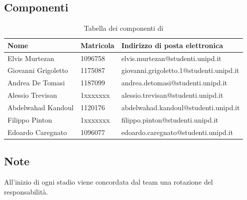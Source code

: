 \subsection{Componenti}
{
    \renewcommand{\arraystretch}{2}
	\begin{longtable}{ C{4cm} C{2cm} C{8cm} }
		\caption{Tabella dei componenti di \Gruppo{}}\\
		\rowcolor{\primaryColor}
        \textcolor{\secondaryColor}{\textbf{Nome}} & \textcolor{\secondaryColor}{\textbf{Matricola}} & \textcolor{\secondaryColor}{\textbf{Indirizzo di posta elettronica}}\\\endhead	
        {Elvis Murtezan} & 1096758 & {elvis.murtezan@studenti.unipd.it}\\   
        {Giovanni Grigoletto} & 1175087 & {giovanni.grigoletto.1@studenti.unipd.it}\\    
        {Andrea De Tomasi} & 1187099 & {andrea.detomasi@studenti.unipd.it}\\    
        {Alessio Trevisan} & 1xxxxxxx & {alessio.trevisan@studenti.unipd.it}\\    
        {Abdelwahad Kandoul} & 1120176 & {abdelwahad.kandoul@studenti.unipd.it} \\    
        {Filippo Pinton} & 1xxxxxxx & {filippo.pinton@studenti.unipd.it}\\    
        {Edoardo Caregnato} & 1096077 & {edoardo.caregnato@studenti.unipd.it}\\       
	\end{longtable}
}
\subsection{Note}
All'inizio di ogni stadio viene concordata dal team una rotazione del responsabilità.